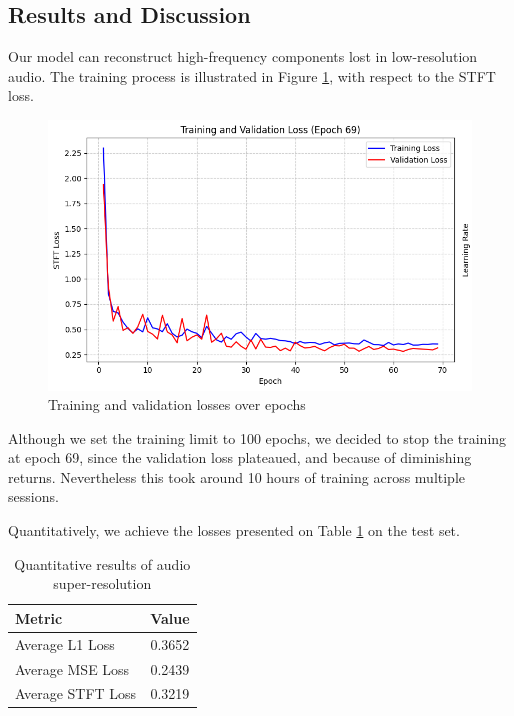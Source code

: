 \documentclass{article}
\begin{document}
\subsection{Results and Discussion}
Our model can reconstruct high-frequency components lost in low-resolution audio. 
The training process is illustrated in Figure \ref{fig:training1}, with respect to the STFT loss.

\begin{figure}[!htb]
    \centering
    \includegraphics[width=1\linewidth]{images/training1.png}
    \vspace{-0.7cm} %
    \caption{Training and validation losses over epochs}
    \label{fig:training1}
\end{figure}

Although we set the training limit to 100 epochs, we decided to stop the training at epoch 69, since the validation loss plateaued, and because of diminishing returns.
Nevertheless this took around 10 hours of training across multiple sessions.

Quantitatively, we achieve the losses presented on Table \ref{tab:results1} on the test set.

\begin{table}[!htb]
    \centering
    \begin{tabular}{lc}
        \toprule
        \textbf{Metric} & \textbf{Value} \\
        \midrule
        Average L1 Loss & 0.3652 \\
        Average MSE Loss & 0.2439 \\
        Average STFT Loss & 0.3219 \\
        \bottomrule
    \end{tabular}
    \caption{Quantitative results of audio super-resolution}
    \label{tab:results1}
\end{table}
\end{document}
